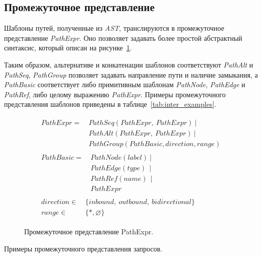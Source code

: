 \subsection{Промежуточное представление}\label{matrix-translation}
Шаблоны путей, полученные из \textit{AST}, транслируются в промежуточное представление \textit{PathExpr}. Оно позволяет задавать более простой абстрактный синтаксис, который описан на рисунке~\ref{fig:intermidiate_repr}. 

Таким образом, альтернативе и конкатенации шаблонов соответствуют \textit{PathAlt} и \textit{PathSeq}, \textit{PathGroup} позволяет задавать направление пути и наличие замыкания, а \textit{PathBasic} соответствует либо примитивным шаблонам \textit{PathNode}, \textit{PathEdge} и \textit{PathRef}, либо целому выражению \textit{PathExpr}. Примеры промежуточного представления шаблонов приведены в таблице~\ref{tab:inter_examples}.
\begin{figure}[h!]
\begin{align*}
\begin{split}
PathExpr=~ &PathSeq(PathExpr,~PathExpr)~|\\
           &PathAlt(PathExpr,~PathExpr)~|\\
           &PathGroup(PathBasic, direction, range)
\end{split}\\
\begin{split}
PathBasic=~ &PathNode(label)~|\\
            &PathEdge(type)~~|\\
            &PathRef(name) ~~|\\
            &PathExpr
\end{split}\\
\begin{split}
direction \in ~&\{inbound,~outbound,~bidirectional\}\\
range \in     ~&\{*, \varnothing\}
\end{split}
\end{align*}
\caption{Промежуточное представление PathExpr.}
\label{fig:intermidiate_repr}
\end{figure}

\begin{table}[h]
\centering
\begin{adjustbox}{max width=\textwidth}

\end{adjustbox}
\caption{Примеры промежуточного представления запросов.}
\label{tab:inter_examples}
\end{table}

